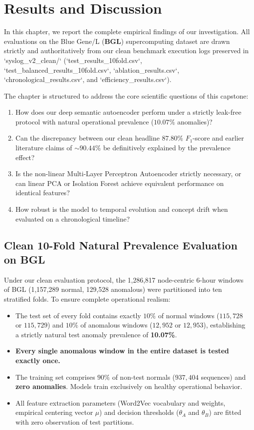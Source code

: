 \chapter{Results and Discussion}
\label{ch:results}

In this chapter, we report the complete empirical findings of our investigation. All evaluations on the Blue Gene/L (\textbf{BGL}) supercomputing dataset are drawn strictly and authoritatively from our clean benchmark execution logs preserved in `syslog_v2_clean/` (`test_results_10fold.csv`, `test_balanced_results_10fold.csv`, `ablation_results.csv`, `chronological_results.csv`, and `efficiency_results.csv`). 

The chapter is structured to address the core scientific questions of this capstone:
\begin{enumerate}
    \item How does our deep semantic autoencoder perform under a strictly leak-free protocol with natural operational prevalence ($10.07\%$ anomalies)?
    \item Can the discrepancy between our clean headline $87.80\%$ $F_1$-score and earlier literature claims of $\sim 90.44\%$ be definitively explained by the prevalence effect?
    \item Is the non-linear Multi-Layer Perceptron Autoencoder strictly necessary, or can linear PCA or Isolation Forest achieve equivalent performance on identical features?
    \item How robust is the model to temporal evolution and concept drift when evaluated on a chronological timeline?
\end{enumerate}

\section{Clean 10-Fold Natural Prevalence Evaluation on BGL}
\label{sec:results_10fold_natural}
Under our clean evaluation protocol, the 1,286,817 node-centric 6-hour windows of BGL (1,157,289 normal, 129,528 anomalous) were partitioned into ten stratified folds. To ensure complete operational realism:
\begin{itemize}
    \item The test set of every fold contains exactly $10\%$ of normal windows ($115,728$ or $115,729$) and $10\%$ of anomalous windows ($12,952$ or $12,953$), establishing a strictly natural test anomaly prevalence of \textbf{10.07\%}.
    \item \textbf{Every single anomalous window in the entire dataset is tested exactly once.}
    \item The training set comprises $90\%$ of non-test normals ($937,404$ sequences) and \textbf{zero anomalies}. Models train exclusively on healthy operational behavior.
    \item All feature extraction parameters (Word2Vec vocabulary and weights, empirical centering vector $\mu$) and decision thresholds ($\theta_A$ and $\theta_B$) are fitted with zero observation of test partitions.
\end{itemize}

